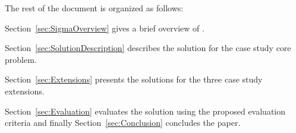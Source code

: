The rest of the document is organized as follows:
\begin{inparaitem}[]
	\item Section~\ref{sec:SigmaOverview} gives a brief overview of \SIGMA.
	\item Section~\ref{sec:SolutionDescription} describes the solution for the case study core problem.
	\item Section~\ref{sec:Extensions} presents the solutions for the three case study extensions.
	\item Section~\ref{sec:Evaluation} evaluates the solution using the proposed evaluation criteria and finally Section~\ref{sec:Conclusion} concludes the paper.
\end{inparaitem}
%
